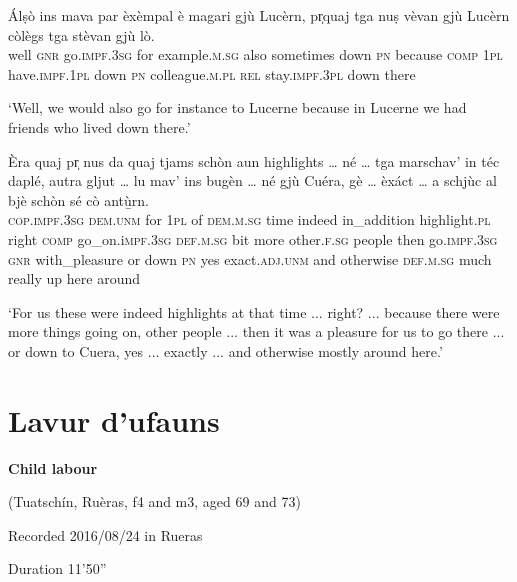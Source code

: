 \begin{linenumbers}
	\gll  Álṣò ins mava par èxèmpal è magari gjù Lucèrn, pr̩quaj tga nuṣ vèvan gjù Lucèrn còlègs tga stèvan gjù lò.\\
	well \textsc{gnr} go.\textsc{impf.3sg} for example\textsc{.m.sg} also sometimes down \textsc{pn} because \textsc{comp} \textsc{1pl} have.\textsc{impf.1pl} down \textsc{pn} colleague.\textsc{m.pl} \textsc{rel} stay.\textsc{impf.3pl} down there\\
\end{linenumbers}
\medskip
\glt `Well, we would also go for instance to Lucerne because in Lucerne we had friends who lived down there.'
\medskip

\begin{linenumbers}
	\gll  Èra quaj pr̩ nus da quaj tjams schòn aun highlights … né … tga marschav’ in téc daplé, autra gljut … lu mav’ ins bugèn … né gjù Cuéra, gè … èxáct … a schjùc al bjè schòn sé cò antù̱rn.\\
\textsc{cop.impf.3sg} \textsc{dem.unm} for \textsc{1pl} of \textsc{dem.m.sg} time indeed in\_addition highlight.\textsc{pl} {} right {} \textsc{comp} go\_on.i\textsc{mpf.3sg} \textsc{def.m.sg} bit more other.\textsc{f.sg} people {} then go.\textsc{impf.3sg} \textsc{gnr} with\_pleasure {} or down \textsc{pn} yes {} exact.\textsc{adj.unm} {} and otherwise \textsc{def.m.sg} much really up here around	\\
\end{linenumbers}
\medskip
\glt `For us these were indeed highlights at that time ... right? ... because there were more things going on, other people ... then it was a pleasure for us to go there ... or down to Cuera, yes ... exactly ... and otherwise mostly around here.'
\medskip

\section{Lavur d'ufauns}

\noindent
\textbf{Child labour}

\noindent
(Tuatschín, Ruèras, f4 and m3, aged 69 and 73)

\noindent
Recorded 2016/08/24 in Rueras

\noindent
Duration 11'50''

\bigskip

